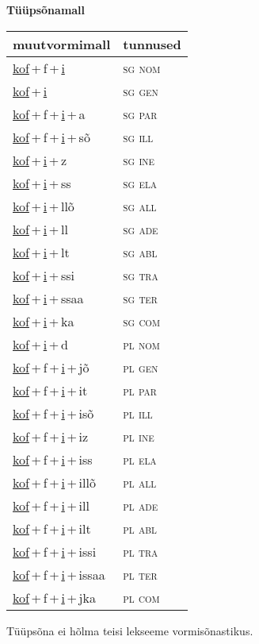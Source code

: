 
\vspace{1.8em}
\begin{minipage}{\textwidth}
\textbf{Tüüpsõnamall \,}\\

\begin{sideways}
\begin{tabular}{l l}
muutvormimall & tunnused \\
\hline
\underline{kof}\,+\,f\,+\,\underline{i} & \textsc{ sg nom } \\
\underline{kof}\,+\,\underline{i} & \textsc{ sg gen } \\
\underline{kof}\,+\,f\,+\,\underline{i}\,+\,a & \textsc{ sg par } \\
\underline{kof}\,+\,f\,+\,\underline{i}\,+\,sõ & \textsc{ sg ill } \\
\underline{kof}\,+\,\underline{i}\,+\,z & \textsc{ sg ine } \\
\underline{kof}\,+\,\underline{i}\,+\,ss & \textsc{ sg ela } \\
\underline{kof}\,+\,\underline{i}\,+\,llõ & \textsc{ sg all } \\
\underline{kof}\,+\,\underline{i}\,+\,ll & \textsc{ sg ade } \\
\underline{kof}\,+\,\underline{i}\,+\,lt & \textsc{ sg abl } \\
\underline{kof}\,+\,\underline{i}\,+\,ssi & \textsc{ sg tra } \\
\underline{kof}\,+\,\underline{i}\,+\,ssaa & \textsc{ sg ter } \\
\underline{kof}\,+\,\underline{i}\,+\,ka & \textsc{ sg com } \\
\underline{kof}\,+\,\underline{i}\,+\,d & \textsc{ pl nom } \\
\underline{kof}\,+\,f\,+\,\underline{i}\,+\,jõ & \textsc{ pl gen } \\
\underline{kof}\,+\,f\,+\,\underline{i}\,+\,it & \textsc{ pl par } \\
\underline{kof}\,+\,f\,+\,\underline{i}\,+\,isõ & \textsc{ pl ill } \\
\underline{kof}\,+\,f\,+\,\underline{i}\,+\,iz & \textsc{ pl ine } \\
\underline{kof}\,+\,f\,+\,\underline{i}\,+\,iss & \textsc{ pl ela } \\
\underline{kof}\,+\,f\,+\,\underline{i}\,+\,illõ & \textsc{ pl all } \\
\underline{kof}\,+\,f\,+\,\underline{i}\,+\,ill & \textsc{ pl ade } \\
\underline{kof}\,+\,f\,+\,\underline{i}\,+\,ilt & \textsc{ pl abl } \\
\underline{kof}\,+\,f\,+\,\underline{i}\,+\,issi & \textsc{ pl tra } \\
\underline{kof}\,+\,f\,+\,\underline{i}\,+\,issaa & \textsc{ pl ter } \\
\underline{kof}\,+\,f\,+\,\underline{i}\,+\,jka & \textsc{ pl com } \\
\end{tabular}
\end{sideways}
\label{tab:tüüpsõnamall-koffi}

\end{minipage}

 
\vspace{1em}
\noindent Tüüpsõna ei hõlma teisi lekseeme vormi\-sõnastikus.
